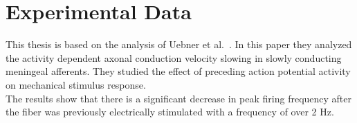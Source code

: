 \section{Experimental Data}
This thesis is based on the analysis of Uebner et al.~\cite{roberto}. In this paper they analyzed the activity dependent axonal conduction velocity slowing in slowly conducting meningeal afferents. They studied the effect of preceding action potential activity on mechanical stimulus response.\\
The results show that there is a significant decrease in peak firing frequency after the fiber was previously electrically stimulated with a frequency of over 2 Hz.




 
\cleardoublepage
